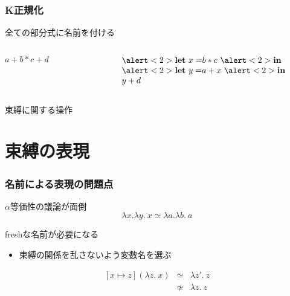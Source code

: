 \documentclass[dvipdfmx,cjk,xcolor=dvipsnames,envcountsect,notheorems,12pt]{beamer}
\theoremstyle{definition}
\newcommand{\keyword}[1]{\mathbf{#1}}
\newcommand{\LET}{\keyword{let}}
\newcommand{\IN}{\keyword{in}}
\begin{document}
\begin{frame}
	\frametitle{K正規化}
	\LARGE
	全ての部分式に名前を付ける

	\begin{columns}
		\begin{column}{0.5\textwidth}
			\begin{center}
				$a+b*c+d$
			\end{center}
		\end{column}
		\begin{column}{0.5\textwidth}
			\begin{center}
				\[
					\begin{array}{l}
						\alert<2>{\LET~x =} b * c~\alert<2>{\IN} \\
						\alert<2>{\LET~y =} a + x~\alert<2>{\IN} \\
						y + d
					\end{array}
				\]
			\end{center}
		\end{column}
	\end{columns}

	\vfill

	\alert<2>{束縛に関する操作}
	\pause
\end{frame}

\section{束縛の表現}

\begin{frame}
	\frametitle{名前による表現の問題点}
	\LARGE $\alpha$等価性の議論が面倒
	\[ \lambda x.\lambda y.~x \simeq \lambda a.\lambda b.~a \]

	\vfill

	freshな名前が必要になる
	\begin{itemize}
		\item 束縛の関係を乱さないよう変数名を選ぶ
	\end{itemize}
	\[
		\begin{array}{lcl}
			[x \mapsto z](\lambda z.~x) & \simeq & \lambda z'.~z \\
																	& \not \simeq & \lambda z.~z
		\end{array}
	\]
\end{frame}
\end{document}
